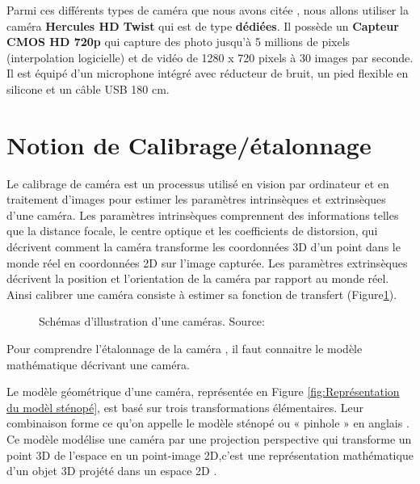  Parmi ces différents types de caméra que nous avons citée , nous allons utiliser la caméra \textbf{Hercules HD Twist} qui est de type \textbf{dédiées}. Il possède un \textbf{Capteur CMOS HD 720p} qui capture des photo jusqu’à 5 millions de pixels (interpolation logicielle) et de vidéo de 1280 x 720 pixels à 30 images par seconde. Il est équipé d'un microphone intégré avec réducteur de bruit, un pied flexible en silicone et un câble USB 180 cm.
 \newpage
 
 
 \section{Notion de  Calibrage/étalonnage}\label{sec:Notion de  Calibrage/étalonnage}
 
 Le calibrage de caméra est un processus utilisé en vision par ordinateur et en traitement d'images pour estimer les paramètres intrinsèques et extrinsèques d'une caméra. Les paramètres intrinsèques comprennent des informations telles que la distance focale, le centre optique et les coefficients de distorsion, qui décrivent comment la caméra transforme les coordonnées 3D d'un point dans le monde réel en coordonnées 2D sur l'image capturée. Les paramètres extrinsèques décrivent la position et l'orientation de la caméra par rapport au monde réel.\\
 Ainsi calibrer une caméra consiste à estimer sa fonction de transfert \cite{orteu_calibrage_nodate} (Figure\ref{fig:Illustration caméras}).
 
 \begin{figure}[H]%
 	\center%
 	\setlength{\fboxsep}{5pt}%
 	\setlength{\fboxrule}{0.5pt}%
   \caption[Illustration d'une caméras]{Schémas d'illustration d'une caméras. Source: \cite{orteu_calibrage_nodate}}
   \label{fig:Illustration caméras}
 \end{figure}
 
 Pour comprendre l'étalonnage de la caméra , il faut connaitre le modèle mathématique décrivant une caméra.
 
 Le modèle géométrique d’une caméra, représentée en Figure \ref{fig:Représentation du modèl sténopé}, est basé sur trois transformations élémentaires. Leur combinaison forme ce qu’on appelle le modèle sténopé ou « pinhole » en anglais \cite{eikosim_etalonnage_2021}.
  Ce modèle modélise une caméra par une projection perspective qui transforme un point 3D de l'espace en un point-image 2D,c'est une représentation mathématique d'un objet 3D projété dans un espace 2D  \cite{orteu_calibrage_nodate}.
  
